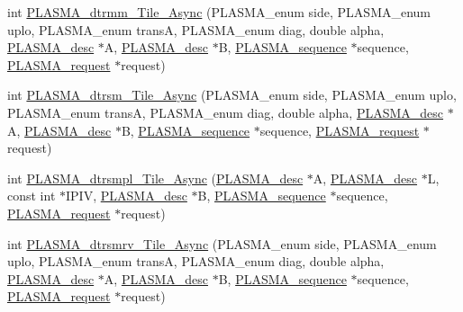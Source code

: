 \begin{DoxyCompactItemize}
int \hyperlink{group__double__Tile__Async_ga42fdacb65d1453ef0453cd467a056f0b_ga42fdacb65d1453ef0453cd467a056f0b}{P\+L\+A\+S\+M\+A\+\_\+dtrmm\+\_\+\+Tile\+\_\+\+Async} (P\+L\+A\+S\+M\+A\+\_\+enum side, P\+L\+A\+S\+M\+A\+\_\+enum uplo, P\+L\+A\+S\+M\+A\+\_\+enum trans\+A, P\+L\+A\+S\+M\+A\+\_\+enum diag, double alpha, \hyperlink{structplasma__desc__t}{P\+L\+A\+S\+M\+A\+\_\+desc} $\ast$A, \hyperlink{structplasma__desc__t}{P\+L\+A\+S\+M\+A\+\_\+desc} $\ast$B, \hyperlink{structplasma__sequence__t}{P\+L\+A\+S\+M\+A\+\_\+sequence} $\ast$sequence, \hyperlink{structplasma__request__t}{P\+L\+A\+S\+M\+A\+\_\+request} $\ast$request)
\item 
int \hyperlink{group__double__Tile__Async_ga41432c6278f8f5deaa5b71c365bdead4_ga41432c6278f8f5deaa5b71c365bdead4}{P\+L\+A\+S\+M\+A\+\_\+dtrsm\+\_\+\+Tile\+\_\+\+Async} (P\+L\+A\+S\+M\+A\+\_\+enum side, P\+L\+A\+S\+M\+A\+\_\+enum uplo, P\+L\+A\+S\+M\+A\+\_\+enum trans\+A, P\+L\+A\+S\+M\+A\+\_\+enum diag, double alpha, \hyperlink{structplasma__desc__t}{P\+L\+A\+S\+M\+A\+\_\+desc} $\ast$A, \hyperlink{structplasma__desc__t}{P\+L\+A\+S\+M\+A\+\_\+desc} $\ast$B, \hyperlink{structplasma__sequence__t}{P\+L\+A\+S\+M\+A\+\_\+sequence} $\ast$sequence, \hyperlink{structplasma__request__t}{P\+L\+A\+S\+M\+A\+\_\+request} $\ast$request)
\item 
int \hyperlink{group__double__Tile__Async_gaafe579e000a11964813a906e5d158e1e_gaafe579e000a11964813a906e5d158e1e}{P\+L\+A\+S\+M\+A\+\_\+dtrsmpl\+\_\+\+Tile\+\_\+\+Async} (\hyperlink{structplasma__desc__t}{P\+L\+A\+S\+M\+A\+\_\+desc} $\ast$A, \hyperlink{structplasma__desc__t}{P\+L\+A\+S\+M\+A\+\_\+desc} $\ast$L, const int $\ast$I\+P\+I\+V, \hyperlink{structplasma__desc__t}{P\+L\+A\+S\+M\+A\+\_\+desc} $\ast$B, \hyperlink{structplasma__sequence__t}{P\+L\+A\+S\+M\+A\+\_\+sequence} $\ast$sequence, \hyperlink{structplasma__request__t}{P\+L\+A\+S\+M\+A\+\_\+request} $\ast$request)
\item 
int \hyperlink{group__double__Tile__Async_ga1b89ad8bffc83dd40aae6a713c8fe908_ga1b89ad8bffc83dd40aae6a713c8fe908}{P\+L\+A\+S\+M\+A\+\_\+dtrsmrv\+\_\+\+Tile\+\_\+\+Async} (P\+L\+A\+S\+M\+A\+\_\+enum side, P\+L\+A\+S\+M\+A\+\_\+enum uplo, P\+L\+A\+S\+M\+A\+\_\+enum trans\+A, P\+L\+A\+S\+M\+A\+\_\+enum diag, double alpha, \hyperlink{structplasma__desc__t}{P\+L\+A\+S\+M\+A\+\_\+desc} $\ast$A, \hyperlink{structplasma__desc__t}{P\+L\+A\+S\+M\+A\+\_\+desc} $\ast$B, \hyperlink{structplasma__sequence__t}{P\+L\+A\+S\+M\+A\+\_\+sequence} $\ast$sequence, \hyperlink{structplasma__request__t}{P\+L\+A\+S\+M\+A\+\_\+request} $\ast$request)

\end{DoxyCompactItemize}
